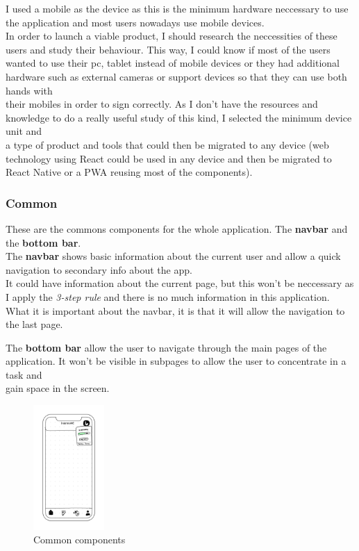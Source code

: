 I used a mobile as the device as this is the minimum hardware neccessary to use the application and most users nowadays use mobile devices. \\
In order to launch a viable product, I should research the neccessities of these users and study their behaviour. This way, I could know if most of the users \\
wanted to use their pc, tablet instead of mobile devices or they had additional hardware such as external cameras or support devices so that they can use both hands with \\
their mobiles in order to sign correctly. As I don't have the resources and knowledge to do a really useful study of this kind, I selected the minimum device unit and \\
a type of product and tools that could then be migrated to any device (web technology using React could be used in any device and then be migrated to React Native or a PWA reusing most of the components).\\
\subsubsection{Common}
These are the commons components for the whole application. The \textbf{navbar} and the \textbf{bottom bar}. \\

The \textbf{navbar} shows basic information about the current user and allow a quick navigation to secondary info about the app. \\
It could have information about the current page, but this won't be neccessary as I apply the \textit{3-step rule} and there is no much information in this application. \\
What it is important about the navbar, it is that it will allow the navigation to the last page.

The \textbf{bottom bar} allow the user to navigate through the main pages of the application. It won't be visible in subpages to allow the user to concentrate in a task and \\
gain space in the screen. \\
\begin{figure}[H]
    \centering
    \includegraphics[width=0.24\textwidth]{assets/screens/Button - User.png}
    \caption{Common components}
    \label{fig:design_common}
\end{figure}

